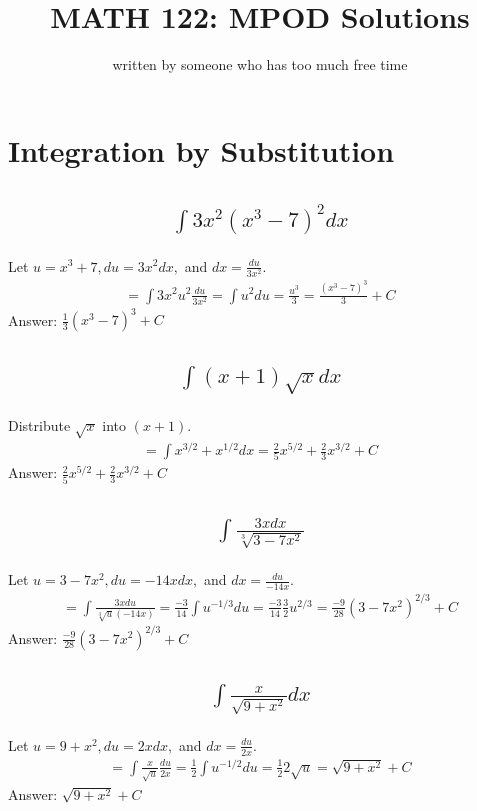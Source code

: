 \documentclass{article}
\title{MATH 122: MPOD Solutions}
\author{written by someone who has too much free time}
\begin{document}
\maketitle
\tableofcontents
\newpage


\section{Integration by Substitution}
\subsection{
	\begin{align*}
		\int{3x^2 (x^3 - 7)^2 dx}
	\end{align*}
}
Let $u = x^3 + 7, du = 3x^2 dx,$ and $dx = \frac{du}{3x^2}$.
\begin{align*}
	= \int{3x^2 u^2 \frac{du}{3x^2}} = \int{u^2 du} = \frac{u^3}{3} = \frac{(x^3 - 7)^3}{3} + C
\end{align*}
Answer: $\frac{1}{3}(x^3 - 7)^3 + C$

\subsection{
	\begin{align*}
		\int{(x+1)\sqrt{x}dx}
	\end{align*}
}
Distribute $\sqrt{x}$ into $(x + 1)$. 
\begin{align*}
	= \int{x^{3/2} + x^{1/2} dx} = \frac{2}{5}x^{5/2} + \frac{2}{3}x^{3/2} + C
\end{align*}
Answer: $\frac{2}{5}x^{5/2} + \frac{2}{3}x^{3/2} + C$

\subsection{
	\begin{align*}
		\int{\frac{3x dx}{\sqrt[3]{3 - 7x^2}}}
	\end{align*}
}
Let $u = 3 - 7x^2, du = -14x dx,$ and $dx = \frac{du}{-14x}$.
\begin{align*}
	= \int{\frac{3xdu}{\sqrt[3]{u}(-14x)}} = \frac{-3}{14} \int{u^{-1/3}du} = \frac{-3}{14} \frac{3}{2} u^{2/3} = \frac{-9}{28} (3 - 7x^2)^{2/3} + C
\end{align*}
Answer: $\frac{-9}{28} (3 - 7x^2)^{2/3} + C$

\subsection{
	\begin{align*}
		\int{\frac{x}{\sqrt{9 + x^2}} dx}
	\end{align*}
}
Let $u = 9 + x^2, du = 2x dx,$ and $dx = \frac{du}{2x}$. 
\begin{align*}
	= \int{\frac{x}{\sqrt{u}} \frac{du}{2x}} = \frac{1}{2} \int{u^{-1/2} du} = \frac{1}{2} 2 \sqrt{u} = \sqrt{9+ x^2} + C
\end{align*}
Answer: $\sqrt{9+ x^2} + C$
\end{document}
